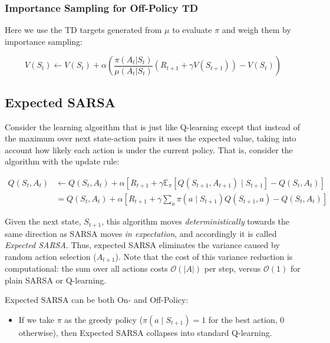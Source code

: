 \subsubsection{Importance Sampling for Off-Policy TD}\label{sec:importance_sampling_td}
Here we use the TD targets generated from $\mu$ to evaluate $\pi$ and weigh them by importance sampling:

\[
    V(S_t) \gets V(S_t) + \alpha \left( \frac{\pi(A_t \vert S_t)}{\mu(A_t \vert S_t)}(R_{t+1} + \gamma V(S_{t+1})) - V(S_t) \right)
\]

\subsection{Expected SARSA}
Consider the learning algorithm that is just like Q-learning except that instead of the maximum over next state-action pairs it uses the expected value, taking into account how likely each action is under the current policy. That is, consider the algorithm with the update rule:

\begin{align*}
    Q(S_t, A_t) &\gets Q(S_t, A_t) + \alpha \left[ R_{t+1} + \gamma \mathbb{E}_\pi [Q(S_{t+1},A_{t+1}) \mid S_{t+1}] - Q(S_t, A_t) \right] \\
               &= Q(S_t, A_t) + \alpha \left[ R_{t+1} + \gamma  \sum_{a} \pi(a \mid S_{t+1})Q(S_{t+1},a) - Q(S_t, A_t) \right]
\end{align*}

Given the next state, $S_{t+1}$, this algorithm moves \emph{deterministically} towards the same direction as SARSA moves \emph{in expectation}, and accordingly it is called \emph{Expected SARSA}. Thus, expected SARSA eliminates the variance caused by random action selection ($A_{t+1}$). Note that the cost of this variance reduction is computational: the sum over all actions costs $\mathcal{O}(\lvert A \rvert)$ per step, versus $\mathcal{O}(1)$ for plain SARSA or Q-learning.

Expected SARSA can be both On- and Off-Policy:
\begin{itemize}
    \item If we take $\pi$ as the greedy policy ($\pi(a \mid S_{t+1}) = 1$ for the best action, $0$ otherwise), then Expected SARSA collapses into standard Q-learning.
\end{itemize}

